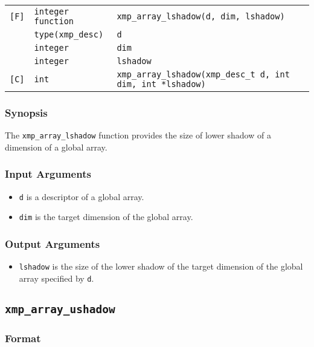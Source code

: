 \begin{tabular}{lll}

\verb![F]!& {\tt integer function}& {\tt xmp\_array\_lshadow(d, dim, lshadow)}\\
          & {\tt type(xmp\_desc)} & {\tt d}\\
          & {\tt integer} & {\tt dim}\\
          & {\tt integer} & {\tt lshadow}\\

\verb![C]!&  {\tt int}& {\tt xmp\_array\_lshadow(xmp\_desc\_t d, int dim, int *lshadow)}\\

\end{tabular}

\subsubsection*{Synopsis}

The {\tt xmp\_array\_lshadow} function provides the size of lower shadow
of a dimension of a global array.


\subsubsection*{Input Arguments}
\begin{itemize}
 \item {\tt d} is a descriptor of a global array.
 \item {\tt dim} is the target dimension of the global array.
\end{itemize}

\subsubsection*{Output Arguments}
\begin{itemize}
 \item {\tt lshadow} is the size of the lower shadow of the target
       dimension of the global array specified by {\tt d}.
\end{itemize}


\subsection{\tt xmp\_array\_ushadow}

\subsubsection*{Format}

